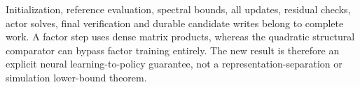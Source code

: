 Initialization, reference evaluation, spectral bounds, all updates, residual
checks, actor solves, final verification and durable candidate writes belong
to complete work. A factor step uses dense matrix products, whereas the
quadratic structural comparator can bypass factor training entirely. The
new result is therefore an explicit neural learning-to-policy guarantee,
not a representation-separation or simulation lower-bound theorem.
